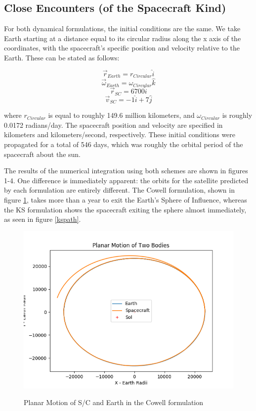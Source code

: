 \documentclass[11pt,twoside,letterpaper]{article}
\begin{document}
  \subsection {Close Encounters (of the Spacecraft Kind)}
  For both dynamical formulations, the initial conditions are the
  same. We take Earth starting at a distance equal to its circular
  radius along the x axis of the coordinates, with the spacecraft's
  specific position and velocity relative to the Earth. These can be
  stated as follows:

  \begin{equation} \label{ics}
    \vec{r}_{Earth} = r_{Circular}\hat{i}
  \end{equation}
  \begin{equation}
    \vec{\omega}_{Earth} = \omega_{Circular}\hat{k}
  \end{equation}
  \begin{equation}
    \vec{r}_{SC} = 6700\hat{i}
  \end{equation}
  \begin{equation}
    \vec{v}_{SC} = -1\hat{i} + 7\hat{j}
  \end{equation}

  where \(r_{Circular}\) is equal to roughly 149.6 million kilometers,
  and \(\omega_{Circular}\) is roughly 0.0172 radians/day. The
  spacecraft position and velocity are specified in kilometers and
  kilometers/second, respectively. These initial conditions were
  propagated for a total of 546 days, which was roughly the orbital
  period of the spacecraft about the sun. 

  The results of the numerical integration using both schemes are
  shown in figures 1-4. One difference is immediately apparent: the
  orbits for the satellite predicted by each formulation are entirely
  different. The Cowell formulation, shown in figure \ref{cowPath},
  takes more than a year to exit the Earth's Sphere of Influence,
  whereas the KS formulation shows the spacecraft exiting the sphere
  almost immediately, as seen in figure \ref{kspath}.

  \begin{figure}
    \caption{Planar Motion of S/C and Earth in the Cowell formulation}
    \centering
    \includegraphics[scale=0.5]{PlanarPath90}
    \label{cowPath}
  \end{figure}
\end{document}
